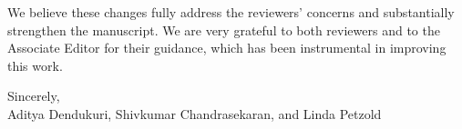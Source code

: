\documentclass[11pt]{article}
\begin{document}
We believe these changes fully address the reviewers' concerns and substantially
strengthen the manuscript. We are very grateful to both reviewers and to the
Associate Editor for their guidance, which has been instrumental in improving this
work.

\vspace{1em}
\noindent Sincerely,\\[0.5em]
Aditya Dendukuri, Shivkumar Chandrasekaran, and Linda Petzold
\end{document}
